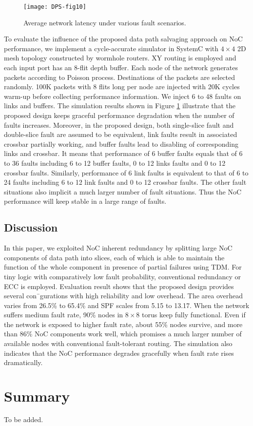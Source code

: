 \begin{figure}[h]
      \centering
        \texttt{[image: DPS-fig10]}
        \caption{Average network latency under various fault scenarios.}
        \label{fig:dps-fig10}
\end{figure}

To evaluate the influence of the proposed data path salvaging approach on NoC performance, we implement a cycle-accurate simulator in SystemC with $4 \times 4$ 2D mesh topology constructed by wormhole routers. XY routing is employed and each input port has an 8-flit depth buffer. Each node of the network generates packets according to Poisson process. Destinations of the packets are selected randomly. 100K packets with 8 flits long per node are injected with 20K cycles warm-up before collecting performance information. We inject 6 to 48 faults on links and buffers. The simulation results shown in Figure \ref{fig:dps-fig10} illustrate that the proposed design keeps graceful performance degradation when the number of faults increases. Moreover, in the proposed design, both single-slice fault and double-slice fault are assumed to be equivalent, link faults result in associated crossbar partially working, and buffer faults lead to disabling of corresponding links and crossbar. It means that performance of 6 buffer faults equals that of 6 to 36 faults including 6 to 12 buffer faults, 0 to 12 links faults and 0 to 12 crossbar faults. Similarly, performance of 6 link faults is equivalent to that of 6 to 24 faults including 6 to 12 link faults and 0 to 12 crossbar faults. The other fault situations also implicit a much larger number of fault situations. Thus the NoC performance will keep stable in a large range of faults.

\subsection{Discussion}
In this paper, we exploited NoC inherent redundancy by splitting large NoC components of data path into slices, each of which is able to maintain the function of the whole component in presence of partial failures using TDM. For tiny logic with comparatively low fault probability, conventional redundancy or ECC is employed. Evaluation result shows that the proposed design provides several con¯gurations with high reliability and low overhead. The area overhead varies from 26.5\% to 65.4\% and SPF scales from 5.15 to 13.17. When the network suffers medium fault rate, 90\% nodes in $8 \times 8$ torus keep fully functional. Even if the network is exposed to higher fault rate, about 55\% nodes survive, and more than 86\% NoC components work well, which promises a much larger number of available nodes with conventional fault-tolerant routing. The simulation also indicates that the NoC performance degrades gracefully when fault rate rises dramatically.

\section{Summary}
To be added.





